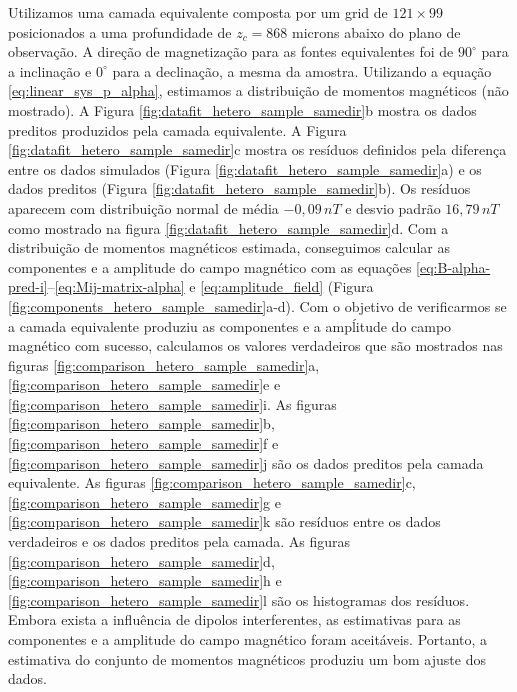 Utilizamos uma camada equivalente composta por um grid de $121 \times 99$ posicionados a uma profundidade de $z_c = 868$ microns abaixo do plano de observação. A direção de magnetização para as fontes equivalentes foi de $90^\circ$ para a inclinação e $0^\circ$ para a declinação, a mesma da amostra. 
Utilizando a equação \ref{eq:linear_sys_p_alpha}, estimamos a distribuição de momentos magnéticos (não mostrado). A Figura \ref{fig:datafit_hetero_sample_samedir}b mostra os dados preditos produzidos pela camada equivalente. A Figura \ref{fig:datafit_hetero_sample_samedir}c mostra os resíduos definidos pela diferença entre os dados simulados (Figura \ref{fig:datafit_hetero_sample_samedir}a) e os dados preditos (Figura \ref{fig:datafit_hetero_sample_samedir}b). Os resíduos aparecem com distribuição normal de média $-0,09 \, nT$ e desvio padrão $16,79 \, nT$ como mostrado na figura \ref{fig:datafit_hetero_sample_samedir}d. Com a distribuição de momentos magnéticos estimada, conseguimos calcular as componentes e a amplitude do campo magnético com as equações \ref{eq:B-alpha-pred-i}--\ref{eq:Mij-matrix-alpha} e \ref{eq:amplitude_field} (Figura \ref{fig:components_hetero_sample_samedir}a-d). Com o objetivo de verificarmos se a camada equivalente produziu as componentes e a ampĺitude do campo magnético com sucesso, calculamos os valores verdadeiros que são mostrados nas  figuras \ref{fig:comparison_hetero_sample_samedir}a, \ref{fig:comparison_hetero_sample_samedir}e e \ref{fig:comparison_hetero_sample_samedir}i. As figuras \ref{fig:comparison_hetero_sample_samedir}b, \ref{fig:comparison_hetero_sample_samedir}f e \ref{fig:comparison_hetero_sample_samedir}j são os dados preditos pela camada equivalente. As figuras \ref{fig:comparison_hetero_sample_samedir}c, \ref{fig:comparison_hetero_sample_samedir}g e \ref{fig:comparison_hetero_sample_samedir}k são resíduos entre os dados verdadeiros e os dados preditos pela camada. As figuras \ref{fig:comparison_hetero_sample_samedir}d, \ref{fig:comparison_hetero_sample_samedir}h e \ref{fig:comparison_hetero_sample_samedir}l são os histogramas dos resíduos. Embora exista a influência de dipolos interferentes, as estimativas para as componentes e a amplitude do campo magnético foram aceitáveis. Portanto, a estimativa do conjunto de momentos magnéticos produziu um bom ajuste dos dados.   



